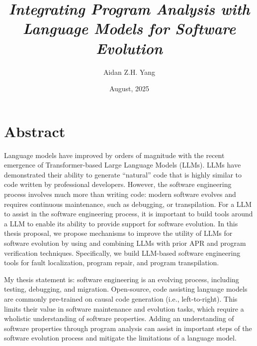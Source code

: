 \documentclass[12pt,openany,oneside,table]{cmuthesis}
\begin{document}
\frontmatter

\pagestyle{empty}
\let\cleardoublepage\clearpage %

\title{ {\it \huge Integrating Program Analysis with Language Models for Software Evolution}}
\author{Aidan Z.H. Yang}
\date{August, 2025}





\maketitle

\pagestyle{plain} %
\section*{Abstract}

Language models have improved by orders of magnitude with the recent emergence
of Transformer-based Large Language Models (LLMs). 
LLMs have demonstrated their ability to generate ``natural'' code that is highly similar to code written by
professional developers. 
However, the software engineering process involves much more than writing code: modern software evolves and requires continuous maintenance, such as debugging, or transpilation. 
For a LLM to assist in the software engineering process, it is important to build tools around a LLM to enable its ability to provide support for software evolution.
In this thesis proposal, we propose mechanisms to improve the utility of LLMs for software evolution by using and combining LLMs with prior APR and program verification techniques. Specifically, we build LLM-based software engineering tools for fault localization, program repair, and program transpilation.


My thesis statement is:
software engineering is an evolving process, including testing, debugging, and migration. Open-source, code assisting language models are commonly pre-trained on causal code generation (i.e., left-to-right). This limits their value in software maintenance and evolution tasks, which require a wholistic understanding of software properties. Adding an understanding of software properties through program analysis can assist in important steps of the software evolution process and mitigate the limitations of a language model.
\end{document}
